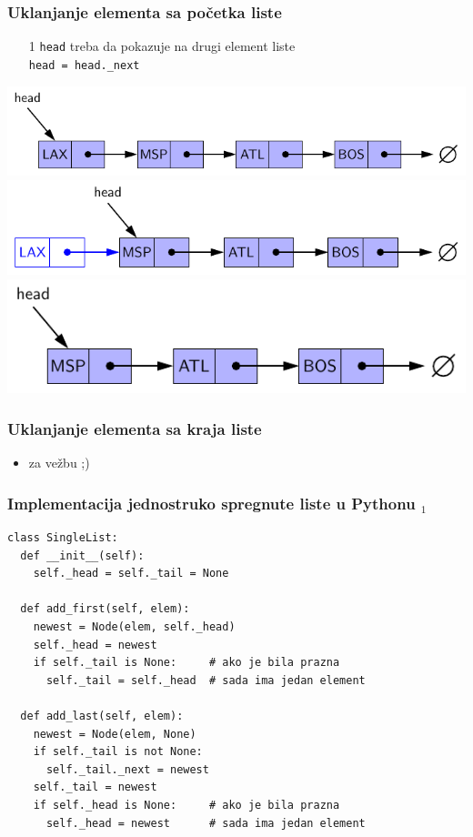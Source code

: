 \documentclass[compress]{beamer}
\begin{document}
\begin{frame}[fragile]
  \frametitle{Uklanjanje elementa sa početka liste}
  \begin{itemize}
    \item[1] \texttt{head} treba da pokazuje na drugi element liste \\
    \texttt{head = head.\_next}
  \end{itemize}
  \begin{center}
    \includegraphics[scale=0.7]{asp-07-pic05a.pdf} \\
    \includegraphics[scale=0.7]{asp-07-pic05b.pdf} \\
    \includegraphics[scale=0.7]{asp-07-pic05c.pdf}
  \end{center}
\end{frame}

\begin{frame}[fragile]
  \frametitle{Uklanjanje elementa sa kraja liste}
  \begin{itemize}
    \item za vežbu ;)
  \end{itemize}
\end{frame}

\begin{frame}
  \frametitle{Implementacija jednostruko spregnute liste u Pythonu $_1$}
\begin{verbatim}
class SingleList:
  def __init__(self):
    self._head = self._tail = None
  
  def add_first(self, elem):
    newest = Node(elem, self._head)
    self._head = newest
    if self._tail is None:     # ako je bila prazna 
      self._tail = self._head  # sada ima jedan element
    
  def add_last(self, elem):
    newest = Node(elem, None)
    if self._tail is not None:
      self._tail._next = newest
    self._tail = newest
    if self._head is None:     # ako je bila prazna
      self._head = newest      # sada ima jedan element
\end{verbatim}
\end{frame}
\end{document}
